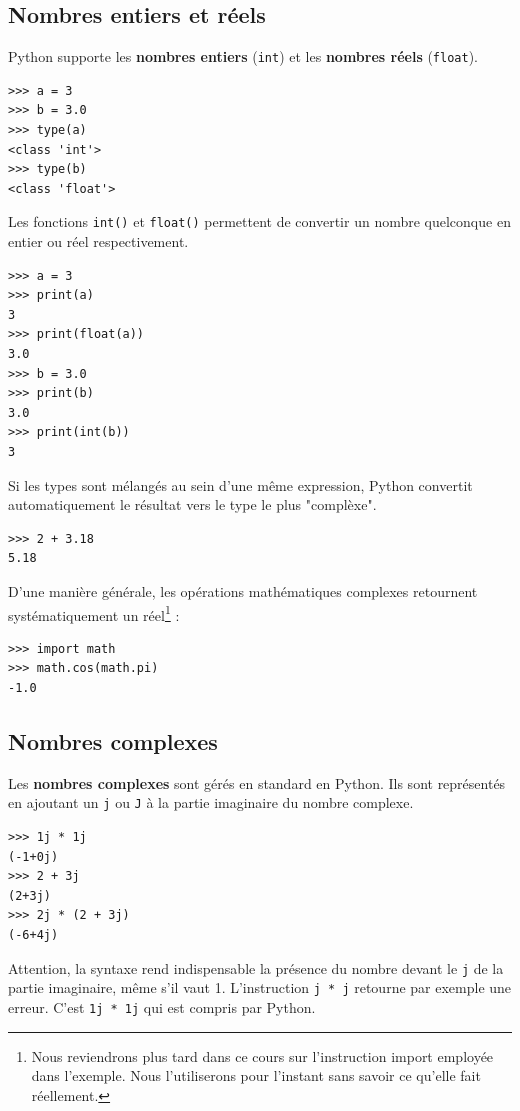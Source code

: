 \documentclass[12pt, a4paper]{article}
\begin{document}
\subsection{Nombres entiers et réels}
Python supporte les \textbf{nombres entiers} (\lstinline{int}) et les \textbf{nombres réels} (\lstinline{float}).
\begin{lstlisting}
>>> a = 3
>>> b = 3.0
>>> type(a)
<class 'int'>
>>> type(b)
<class 'float'>
\end{lstlisting}

Les fonctions \lstinline{int()} et \lstinline{float()} permettent de convertir un nombre quelconque en entier ou réel respectivement.
\begin{lstlisting}
>>> a = 3
>>> print(a)
3
>>> print(float(a))
3.0
>>> b = 3.0
>>> print(b)
3.0
>>> print(int(b))
3
\end{lstlisting}

Si les types sont mélangés au sein d'une même expression, Python convertit automatiquement le résultat vers le type le plus "complèxe".
\begin{lstlisting}
>>> 2 + 3.18
5.18
\end{lstlisting}

D'une manière générale, les opérations mathématiques complexes retournent systématiquement un réel\footnote{Nous reviendrons plus tard dans ce cours sur l'instruction import employée dans l'exemple. Nous l'utiliserons pour l'instant sans savoir ce qu'elle fait réellement.} :
\begin{lstlisting}
>>> import math
>>> math.cos(math.pi)
-1.0
\end{lstlisting}


\subsection{Nombres complexes}
Les \textbf{nombres complexes} sont gérés en standard en Python. Ils sont représentés en ajoutant un \lstinline{j} ou \lstinline{J} à la partie imaginaire du nombre complexe.
\begin{lstlisting}
>>> 1j * 1j
(-1+0j)
>>> 2 + 3j
(2+3j)
>>> 2j * (2 + 3j)
(-6+4j)
\end{lstlisting}

Attention, la syntaxe rend indispensable la présence du nombre devant le \lstinline{j} de la partie imaginaire, même s'il vaut 1. L'instruction \lstinline{j * j} retourne par exemple une erreur. C'est \lstinline{1j * 1j} qui est compris par Python.
\end{document}
